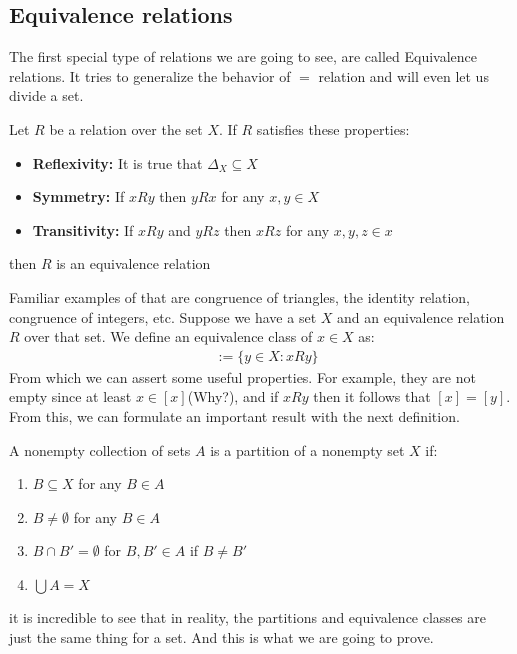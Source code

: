 \documentclass{tufte-handout}
\begin{document}
\subsection{Equivalence relations}
The first special type of relations we are going to see, are called Equivalence relations. It tries to generalize the behavior of $=$ relation and will even let us divide a set.
\begin{definition}
	Let $R$ be a relation over the set $X$. If $R$ satisfies these properties:
	\begin{itemize}
		\item \textbf{Reflexivity:} It is true that $\Delta_X \subseteq X$
		\item \textbf{Symmetry:} If $xRy$ then $yRx$ for any $x, y \in X$
		\item \textbf{Transitivity:} If $xRy$ and $yRz$ then $xRz$ for any $x, y, z \in x$
	\end{itemize}
	then $R$ is an equivalence relation
\end{definition}

Familiar examples of that are congruence of triangles, the identity relation, congruence of integers, etc. Suppose we have a set $X$ and an equivalence relation $R$ over that set. We define an equivalence class of $x \in X$ as:
\begin{align*}
	[x] &:= \{y \in X: xRy\}
\end{align*} 
From which we can assert some useful properties. For example, they are not empty since at least $x \in [x]$(Why?), and if $xRy$ then it follows that $[x] = [y]$. From this, we can formulate an important result with the next definition.

\begin{definition}
	A nonempty collection of sets $A$ is a partition of a nonempty set $X$ if:
	\begin{enumerate}
		\item $B \subseteq X$ for any $B \in A$
		\item $B \neq \emptyset$ for any $B \in A$
		\item $B \cap B' = \emptyset$ for $B, B' \in A$ if $B \neq B'$
		\item $\bigcup A = X$
	\end{enumerate}
\end{definition}

it is incredible to see that in reality, the partitions and equivalence classes are just the same thing for a set. And this is what we are going to prove.
\end{document}
